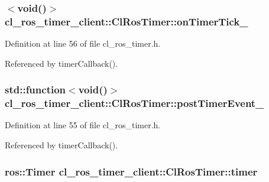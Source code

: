 \subsubsection[{\texorpdfstring{on\+Timer\+Tick\+\_\+}{onTimerTick_}}]{$<$void()$>$ cl\+\_\+ros\+\_\+timer\+\_\+client\+::\+Cl\+Ros\+Timer\+::on\+Timer\+Tick\+\_\+\hspace{0.3cm}{\ttfamily [protected]}}\hypertarget{classcl__ros__timer__client_1_1ClRosTimer_a2d37aff87ee978d4716966bf55d023b4}{}\label{classcl__ros__timer__client_1_1ClRosTimer_a2d37aff87ee978d4716966bf55d023b4}


Definition at line 56 of file cl\+\_\+ros\+\_\+timer.\+h.



Referenced by timer\+Callback().

\subsubsection[{\texorpdfstring{post\+Timer\+Event\+\_\+}{postTimerEvent_}}]{\setlength{\rightskip}{0pt plus 5cm}std\+::function$<$void()$>$ cl\+\_\+ros\+\_\+timer\+\_\+client\+::\+Cl\+Ros\+Timer\+::post\+Timer\+Event\+\_\+\hspace{0.3cm}{\ttfamily [protected]}}\hypertarget{classcl__ros__timer__client_1_1ClRosTimer_a6fb47a4291370f5fefe61dd5123ed008}{}\label{classcl__ros__timer__client_1_1ClRosTimer_a6fb47a4291370f5fefe61dd5123ed008}


Definition at line 55 of file cl\+\_\+ros\+\_\+timer.\+h.



Referenced by timer\+Callback().

\subsubsection[{\texorpdfstring{timer}{timer}}]{\setlength{\rightskip}{0pt plus 5cm}ros\+::\+Timer cl\+\_\+ros\+\_\+timer\+\_\+client\+::\+Cl\+Ros\+Timer\+::timer\hspace{0.3cm}{\ttfamily [protected]}}\hypertarget{classcl__ros__timer__client_1_1ClRosTimer_aa418267464ace5eed5c09340a0c269e4}{}\label{classcl__ros__timer__client_1_1ClRosTimer_aa418267464ace5eed5c09340a0c269e4}


